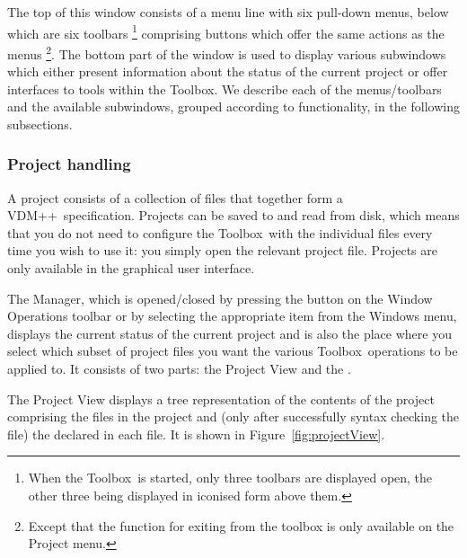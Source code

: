 \documentclass[\pformat,12pt]{article}
\newcommand{\vdmslpp}{VDM++}
\newcommand{\Toolbox}{Toolbox}
\newcommand{\guicmd}[1]{{\sf #1}}
\begin{document}
The top of this window consists of a menu line with six pull-down
menus, below which are six toolbars \footnote{When the \Toolbox\ is
  started, only three toolbars are displayed open, the other three
  being displayed in iconised form above them.} comprising buttons
which offer the same actions as the menus \footnote{Except that the
  function for exiting from the toolbox is only available on the
  \guicmd{Project} menu.}. The bottom part of the window is used to
display various subwindows which either present information about the
status of the current project or offer interfaces to tools within the
\Toolbox. We describe each of the menus/toolbars and the available
subwindows, grouped according to functionality, in the following
subsections.

\subsubsection{Project handling}
A project consists of a collection of files that together form a
\vdmslpp\ specification. Projects can be saved to and read from disk,
which means that you do not need to configure the \Toolbox\ with the
individual files every time you wish to use it: you simply
open the relevant project file. Projects are only available in the
graphical user interface.

The \guicmd{Manager}, which is opened/closed by
pressing the 
button on the \guicmd{Window Operations} toolbar or by
selecting the appropriate item from the \guicmd{Windows} menu,
displays the current status of the current
project and is also  the place where you select which subset of
project files you want the various \Toolbox\ operations to be applied
to. It consists of two parts: the \guicmd{Project View} and the
\ifthenelse{\boolean{VDMsl}}{\guicmd{Module View}}{\guicmd{Class
      View}}.

The \guicmd{Project View} displays a tree representation of the contents
of the project comprising the files in the project and (only after
successfully syntax checking the file) the
 declared in each file. 
It is shown in Figure~\ref{fig:projectView}.
\end{document}
